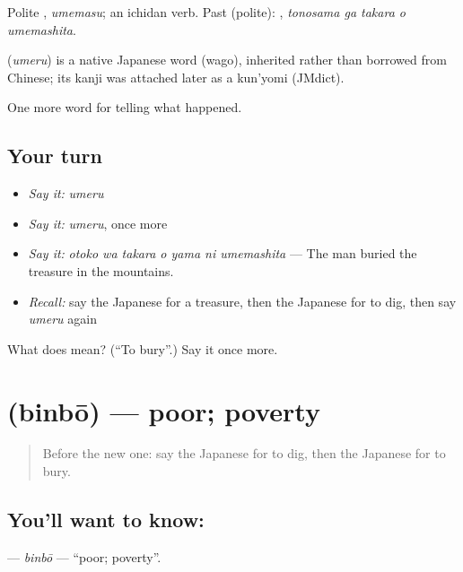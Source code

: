 Polite \textbf{}, \emph{umemasu}; an ichidan verb. Past (polite): \textbf{  }, \emph{tonosama ga takara o umemashita}.

\begin{cousinweb}
\textbf{} (\emph{umeru}) is a native Japanese word (wago), inherited rather than borrowed from Chinese; its kanji was attached later as a kun'yomi (JMdict).
\end{cousinweb}

\begin{grammarlens}[title={What you've built}]
One more word for telling what happened.
\end{grammarlens}

\subsection*{Your turn}
\begin{itemize}
\raggedright
  \item \emph{Say it:} \emph{umeru}
  \item \emph{Say it:} \emph{umeru}, once more
  \item \emph{Say it:} \emph{otoko wa takara o yama ni umemashita} — The man buried the treasure in the mountains.
  \item \emph{Recall:} say the Japanese for a treasure, then the Japanese for to dig, then say \emph{umeru} again
\end{itemize}

\begin{tcolorbox}[breakable,colback=teal!4,colframe=teal!35!black,title={Before you move on}]
What does  mean? (\textquotedblleft{}To bury\textquotedblright{}.) Say it once more.
\end{tcolorbox}
\section[\texorpdfstring{\ja{びんぼう} (binbō)}{びんぼう (binbō)}]{ (binbō) — poor; poverty}

\label{lesson:JA-C301-binbou}



\begin{quote}
Before the new one: say the Japanese for to dig, then the Japanese for to bury.
\end{quote}

\subsection*{You'll want to know: }
\textbf{} — \emph{binbō} — \textquotedblleft{}poor; poverty\textquotedblright{}.


